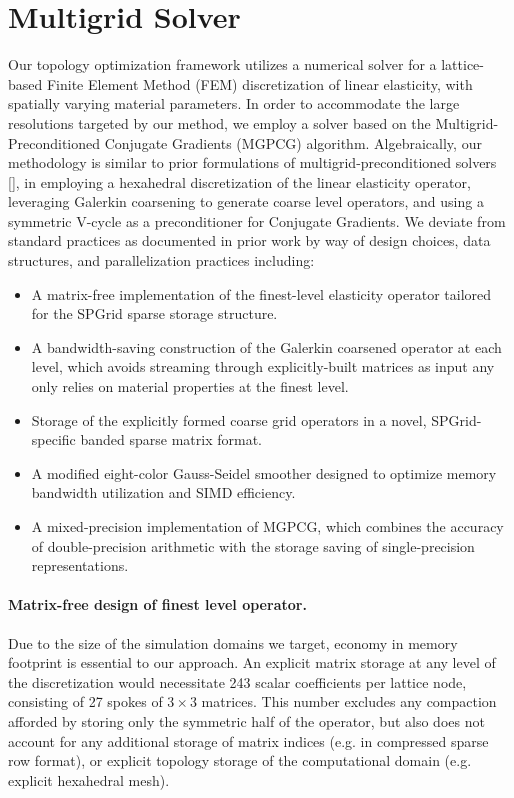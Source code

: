 \section{Multigrid Solver}\label{sec:topopt_multigrid}
Our topology optimization framework utilizes a numerical solver for a lattice-based Finite Element Method (FEM) discretization of linear elasticity, with spatially varying material
parameters. In order to accommodate the large resolutions targeted by our method, we employ a solver based on the Multigrid-Preconditioned Conjugate Gradients (MGPCG)
algorithm. Algebraically, our methodology is similar to prior formulations of multigrid-preconditioned solvers [\cite{wu2016,dick2011real}], in employing a hexahedral discretization of
the linear elasticity operator, leveraging Galerkin coarsening to generate coarse level operators, and using a symmetric V-cycle as a preconditioner for Conjugate Gradients.
We deviate from standard practices as documented in prior work by way of design choices, data structures, and parallelization practices including: 
\begin{itemize}
\item A matrix-free implementation of the finest-level elasticity operator tailored for the SPGrid sparse storage structure.
\item A bandwidth-saving construction of the Galerkin coarsened operator at each level, which avoids streaming through explicitly-built matrices as input any only relies on
material properties at the finest level.
\item Storage of the explicitly formed coarse grid operators in a novel, SPGrid-specific banded sparse matrix format.
\item A modified eight-color Gauss-Seidel smoother designed to optimize memory bandwidth utilization and SIMD efficiency.
\item A mixed-precision implementation of MGPCG, which combines the accuracy of double-precision arithmetic with the storage saving
of single-precision representations.
\end{itemize}

\paragraph{Matrix-free design of finest level operator.} Due to the size of the simulation domains we target, economy in
memory footprint is essential to our approach. An explicit matrix storage at any level of the discretization would
necessitate 243 scalar coefficients per lattice node, consisting of 27 spokes of $3\times 3$ matrices. This number excludes
any compaction afforded by storing only the symmetric half of the operator, but also does not account for any additional
storage of matrix indices (e.g. in compressed sparse row format), or explicit topology storage of the computational
domain (e.g.  explicit hexahedral mesh). 

